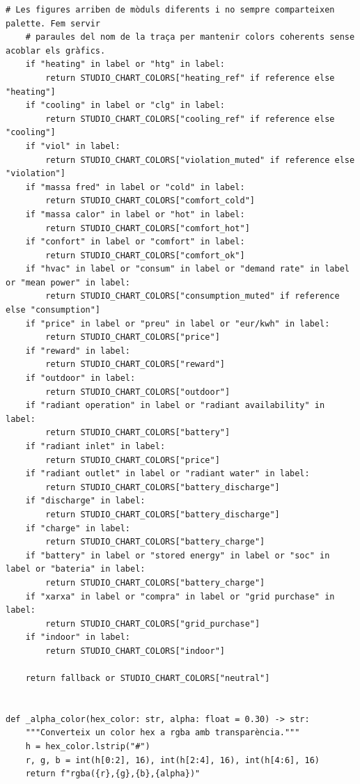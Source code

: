 \documentclass[10pt,a4paper]{article}
\begin{document}
\begin{lstlisting}[style=studioPython,caption={backend/grafics/style.py},label={lst:backend-grafics-style-py}]
    # Les figures arriben de mòduls diferents i no sempre comparteixen palette. Fem servir
    # paraules del nom de la traça per mantenir colors coherents sense acoblar els gràfics.
    if "heating" in label or "htg" in label:
        return STUDIO_CHART_COLORS["heating_ref" if reference else "heating"]
    if "cooling" in label or "clg" in label:
        return STUDIO_CHART_COLORS["cooling_ref" if reference else "cooling"]
    if "viol" in label:
        return STUDIO_CHART_COLORS["violation_muted" if reference else "violation"]
    if "massa fred" in label or "cold" in label:
        return STUDIO_CHART_COLORS["comfort_cold"]
    if "massa calor" in label or "hot" in label:
        return STUDIO_CHART_COLORS["comfort_hot"]
    if "confort" in label or "comfort" in label:
        return STUDIO_CHART_COLORS["comfort_ok"]
    if "hvac" in label or "consum" in label or "demand rate" in label or "mean power" in label:
        return STUDIO_CHART_COLORS["consumption_muted" if reference else "consumption"]
    if "price" in label or "preu" in label or "eur/kwh" in label:
        return STUDIO_CHART_COLORS["price"]
    if "reward" in label:
        return STUDIO_CHART_COLORS["reward"]
    if "outdoor" in label:
        return STUDIO_CHART_COLORS["outdoor"]
    if "radiant operation" in label or "radiant availability" in label:
        return STUDIO_CHART_COLORS["battery"]
    if "radiant inlet" in label:
        return STUDIO_CHART_COLORS["price"]
    if "radiant outlet" in label or "radiant water" in label:
        return STUDIO_CHART_COLORS["battery_discharge"]
    if "discharge" in label:
        return STUDIO_CHART_COLORS["battery_discharge"]
    if "charge" in label:
        return STUDIO_CHART_COLORS["battery_charge"]
    if "battery" in label or "stored energy" in label or "soc" in label or "bateria" in label:
        return STUDIO_CHART_COLORS["battery_charge"]
    if "xarxa" in label or "compra" in label or "grid purchase" in label:
        return STUDIO_CHART_COLORS["grid_purchase"]
    if "indoor" in label:
        return STUDIO_CHART_COLORS["indoor"]

    return fallback or STUDIO_CHART_COLORS["neutral"]


def _alpha_color(hex_color: str, alpha: float = 0.30) -> str:
    """Converteix un color hex a rgba amb transparència."""
    h = hex_color.lstrip("#")
    r, g, b = int(h[0:2], 16), int(h[2:4], 16), int(h[4:6], 16)
    return f"rgba({r},{g},{b},{alpha})"


\end{lstlisting}
\end{document}
